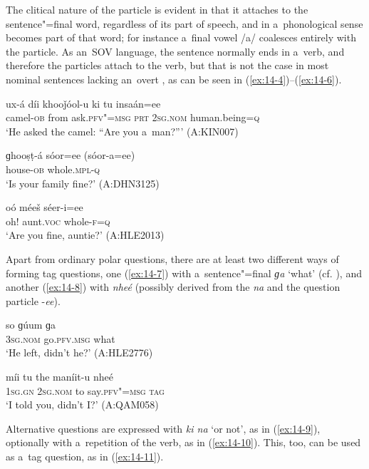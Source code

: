 The clitical nature of the particle is evident in that it attaches to the sentence"=final word, regardless of its part of speech, and in a~phonological sense becomes part of that word; for instance a~final vowel /a/ coalesces entirely with the particle. As an~SOV language, the sentence normally ends in a~verb, and therefore the particles attach to the verb, but that is not the case in most nominal sentences lacking an~overt , as can be seen in (\ref{ex:14-4})--(\ref{ex:14-6}).

\begin{exe}
\ex
\label{ex:14-4}
\gll ux-á díi khooǰóol-u ki tu insaán=ee \\
camel-\textsc{ob} from ask.\textsc{pfv"=msg} \textsc{prt} \textsc{2sg.nom} human.being=\textsc{q} \\
\glt `He asked the camel: ``Are you a~man?''' (A:KIN007)

\ex
\label{ex:14-5}
\gll ɡhooṣṭ-á sóor=ee (sóor-a=ee) \\
house-\textsc{ob} whole.\textsc{mpl-q} \\
\glt `Is your family fine?' (A:DHN3125)

\ex
\label{ex:14-6}
\gll oó méeš séer-i=ee \\
oh! aunt.\textsc{voc} whole-\textsc{f=q} \\
\glt `Are you fine, auntie?' (A:HLE2013)
\end{exe}

Apart from ordinary polar questions, there are at least two different ways of forming tag questions, one (\ref{ex:14-7}) with a~sentence"=final \textit{ɡa} `what' (cf. ), and another (\ref{ex:14-8}) with \textit{nheé} (possibly derived from the  \textit{na} and the question particle -\textit{ee}).

\begin{exe}
\ex
\label{ex:14-7}
\gll so ɡúum ɡa \\
\textsc{3sg.nom} go.\textsc{pfv.msg} what \\
\glt `He left, didn't he?' (A:HLE2776)

\ex
\label{ex:14-8}
\gll míi tu the maníit-u nheé \\
\textsc{1sg.gn} \textsc{2sg.nom} to say.\textsc{pfv"=msg} \textsc{tag} \\
\glt `I told you, didn't I?' (A:QAM058)
\end{exe}

Alternative questions are expressed with \textit{ki na} `or not', as in (\ref{ex:14-9}), optionally with a~repetition of the verb, as in (\ref{ex:14-10}). This, too, can be used as a~tag question, as in (\ref{ex:14-11}).

